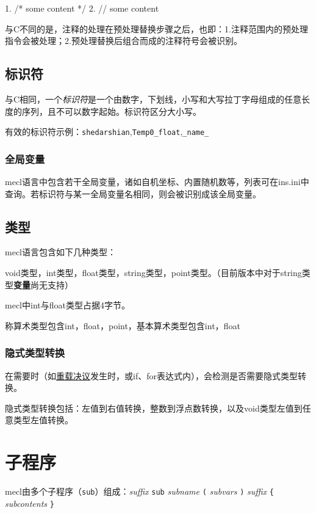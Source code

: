 \documentclass[UTF8]{ctexart}
\begin{document}
\begin{MUAvbt}
1. /* some content */
2. // some content \n
\end{MUAvbt}

与C不同的是，注释的处理在预处理替换步骤之后，也即：1.注释范围内的预处理指令会被处理；2.预处理替换后组合而成的注释符号会被识别。

\subsection{标识符}

与C相同，一个\textit{标识符}是一个由数字，下划线，小写和大写拉丁字母组成的任意长度的序列，且不可以数字起始。标识符区分大小写。

有效的标识符示例：\verb|shedarshian|,\verb|Temp0_float|,\verb|_name_|

\subsubsection{全局变量}

mecl语言中包含若干全局变量，诸如自机坐标、内置随机数等，列表可在ins.ini中查询。若标识符与某一全局变量名相同，则会被识别成该全局变量。

\subsection{类型}

mecl语言包含如下几种类型：

void类型，int类型，float类型，string类型，point类型。（目前版本中对于string类型\textbf{变量}尚无支持）

mecl中int与float类型占据4字节。

称算术类型包含int，float，point，基本算术类型包含int，float

\subsubsection{隐式类型转换}

在需要时（如\hyperref[chongzai]{重载决议}发生时，或if、for表达式内），会检测是否需要隐式类型转换。

隐式类型转换包括：左值到右值转换，整数到浮点数转换，以及void类型左值到任意类型左值转换。

\section{子程序}

mecl由多个子程序（\verb|sub|）组成：\textit{suffix} \verb|sub| \textit{subname} \verb|(| \textit{subvars} \verb|)| \textit{suffix} \verb|{| \textit{subcontents} \verb|}|
\end{document}

